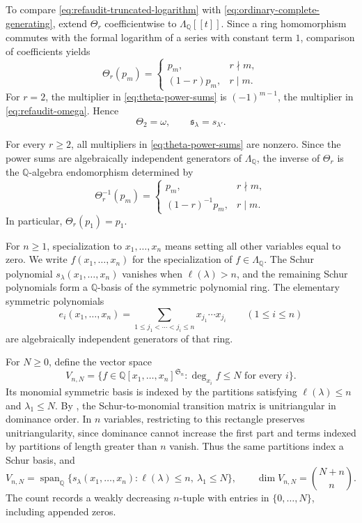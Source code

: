 \documentclass[12pt,reqno,a4paper]{amsart}
\numberwithin{equation}{section}
\numberwithin{figure}{section}
\theoremstyle{plain}
\theoremstyle{definition}
\newcommand{\Sym}{\mathfrak S}
\begin{document}
To compare \eqref{eq:refaudit-truncated-logarithm} with
\eqref{eq:ordinary-complete-generating}, extend
$\Theta_r$ coefficientwise to $\Lambda_{\mathbb Q}[[t]]$.  Since a
ring homomorphism commutes with the formal logarithm of a series with
constant term $1$, comparison of coefficients yields
\begin{equation}\label{eq:theta-power-sums}
\Theta_r(p_m)=
\begin{cases}
p_m,&r\nmid m,\\
(1-r)p_m,&r\mid m.
\end{cases}
\end{equation}
For $r=2$, the multiplier in \eqref{eq:theta-power-sums} is
$(-1)^{m-1}$, the multiplier in \eqref{eq:refaudit-omega}.  Hence
\begin{equation}\label{eq:prime-two-transpose}
\Theta_2=\omega,
\qquad \mathfrak{s}_\lambda=s_{\lambda'}.
\end{equation}

For every $r\geq2$, all multipliers in
\eqref{eq:theta-power-sums} are nonzero.  Since the power sums are
algebraically independent generators of $\Lambda_{\mathbb Q}$, the inverse
of $\Theta_r$ is the $\mathbb Q$-algebra endomorphism determined by
\[
\Theta_r^{-1}(p_m)=
\begin{cases}
p_m,&r\nmid m,\\
(1-r)^{-1}p_m,&r\mid m.
\end{cases}
\]
In particular, $\Theta_r(p_1)=p_1$.

For $n\geq1$, specialization to $x_1,\ldots,x_n$ means setting all
other variables equal to zero.  We write $f(x_1,\ldots,x_n)$
for the specialization of $f\in\Lambda_{\mathbb Q}$.
The Schur polynomial $s_\lambda(x_1,\ldots,x_n)$ vanishes when
$\ell(\lambda)>n$, and the remaining Schur polynomials form a
$\mathbb Q$-basis of the symmetric polynomial ring.
The elementary symmetric polynomials
\[
 e_i(x_1,\ldots,x_n)
 =\sum_{1\leq j_1<\cdots<j_i\leq n}x_{j_1}\cdots x_{j_i}
 \qquad(1\leq i\leq n)
\]
are algebraically independent generators of that ring.

For $N\geq0$, define the vector space
\begin{equation}\label{eq:finite-variable-space}
 V_{n,N}
 =\{f\in\mathbb Q[x_1,\ldots,x_n]^{\Sym_n}:
                  \deg_{x_i}f\leq N\text{ for every }i\}.
\end{equation}
Its monomial symmetric basis is indexed by the partitions satisfying
$\ell(\lambda)\leq n$ and $\lambda_1\leq N$.
By \cite[Chapter~I, (6.5)]{Macdonald}, the Schur-to-monomial
transition matrix is unitriangular in dominance order.
In $n$ variables, restricting to this rectangle preserves
unitriangularity, since dominance cannot increase the first part
and terms indexed by partitions of length greater than $n$ vanish.
Thus the same partitions index a Schur basis, and
\begin{equation}\label{eq:finite-space-basis}
 V_{n,N}
 =\operatorname{span}_{\mathbb Q}
   \{s_\lambda(x_1,\ldots,x_n):\ell(\lambda)\leq n,\ \lambda_1\leq N\},
 \qquad
 \dim V_{n,N}=\binom{N+n}{n}.
\end{equation}
The count records a weakly decreasing $n$-tuple with entries in
$\{0,\ldots,N\}$, including appended zeros.
\end{document}
